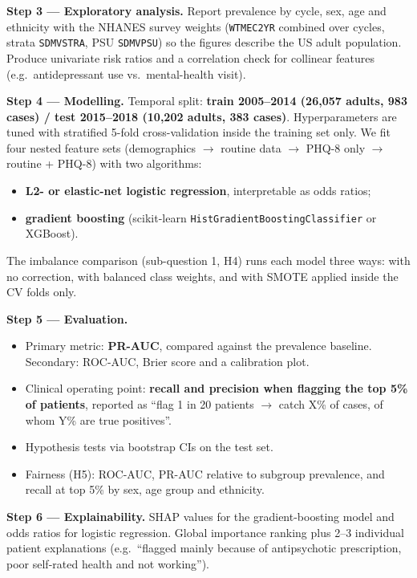 \documentclass[11pt,a4paper]{article}
\newcommand{\var}[1]{\texttt{#1}}
\begin{document}
\textbf{Step 3 --- Exploratory analysis.} Report prevalence by cycle, sex, age and
ethnicity with the NHANES survey weights (\var{WTMEC2YR} combined over cycles, strata
\var{SDMVSTRA}, PSU \var{SDMVPSU}) so the figures describe the US adult population.
Produce univariate risk ratios and a correlation check for collinear features (e.g.\
antidepressant use vs.\ mental-health visit).

\textbf{Step 4 --- Modelling.} Temporal split: \textbf{train 2005--2014 (26,057
adults, 983 cases) / test 2015--2018 (10,202 adults, 383 cases)}. Hyperparameters are
tuned with stratified 5-fold cross-validation inside the training set only. We fit
four nested feature sets (demographics $\rightarrow$ routine data $\rightarrow$ PHQ-8
only $\rightarrow$ routine + PHQ-8) with two algorithms:
\begin{itemize}
  \item \textbf{L2- or elastic-net logistic regression}, interpretable as odds ratios;
  \item \textbf{gradient boosting} (scikit-learn \var{HistGradientBoostingClassifier}
        or XGBoost).
\end{itemize}
The imbalance comparison (sub-question 1, H4) runs each model three ways: with no
correction, with balanced class weights, and with SMOTE applied inside the CV folds only.

\textbf{Step 5 --- Evaluation.}
\begin{itemize}
  \item Primary metric: \textbf{PR-AUC}, compared against the prevalence baseline.
        Secondary: ROC-AUC, Brier score and a calibration plot.
  \item Clinical operating point: \textbf{recall and precision when flagging the top
        5\% of patients}, reported as ``flag 1 in 20 patients $\rightarrow$ catch X\%
        of cases, of whom Y\% are true positives''.
  \item Hypothesis tests via bootstrap CIs on the test set.
  \item Fairness (H5): ROC-AUC, PR-AUC relative to subgroup prevalence, and recall at
        top 5\% by sex, age group and ethnicity.
\end{itemize}

\textbf{Step 6 --- Explainability.} SHAP values for the gradient-boosting model and
odds ratios for logistic regression. Global importance ranking plus 2--3 individual
patient explanations (e.g.\ ``flagged mainly because of antipsychotic prescription,
poor self-rated health and not working'').
\end{document}
